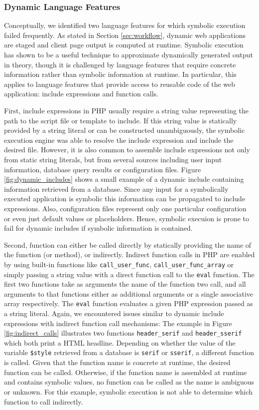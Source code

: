 \documentclass[sigconf]{acmart}
\renewcommand{\tt}[1]{\texttt{#1}}
\begin{document}
\subsubsection{Dynamic Language Features}
\label{sec:experiment_dynamicfeaturess} 
Conceptually, we identified two language features for which symbolic execution
failed frequently. As stated in Section \ref{sec:workflow}, dynamic web
applications are staged and client page output is computed at runtime. Symbolic
execution has shown to be a useful technique to approximate dynamically
generated output in theory, though it is challenged by language features that
require concrete information rather than symbolic information at runtime. In particular, this
applies to language features that provide access to reusable code of the web
application: include expressions and function calls.

First, include expressions in PHP usually require a string value representing
the path to the script file or template to include. If this string value is
statically provided by a string literal or can be constructed unambiguously, the
symbolic execution engine was able to resolve the include expression and include
the desired file. However, it is also common to assemble include expressions not
only from static string literals, but from several sources including user input
information, database query results or configuration files. Figure
\ref{fig:dynamic_includes} shows a small example of a dynamic include containing
information retrieved from a database. Since any input for a symbolically
executed application is symbolic this information can be propagated to include
expressions. Also, configuration files represent only one particular
configuration or even just default values or placeholders. Hence, symbolic
execuion is prone to fail for dynamic includes if symbolic information is contained.

Second, function can either be called directly by statically providing the name
of the function (or method), or indirectly. Indirect function calls in PHP are
enabled by using built-in functions like \tt{call\_user\_func},
\tt{call\_user\_func\_array} or simply passing a string value with a direct
function call to the \tt{eval} function. The first two functions take as
arguments the name of the function two call, and all arguments to that
functions either as additional arguments or a single associative array
respectively.
The \tt{eval} function evaluates a given PHP expression passed as a string
literal.
Again, we encountered issues similar to dynamic include expressions with
indirect function call mechanisms: The example in Figure
\ref{fig:indirect_calls} illustrates two functions \tt{header\_serif} and
\tt{header\_sserif} which both print a HTML headline. Depending on whether the
value of the variable \tt{\$style} retrieved from a database is \tt{serif} or
\tt{sserif}, a different function is called. Given that the function name is 
concrete at runtime, the desired function can be called. Otherwise, if the
function name is assembled at runtime and contains symbolic values, no function
can be called as the name is ambiguous or unknown. For this example, symbolic
execution is not able to determine which function to call indirectly.
\end{document}
